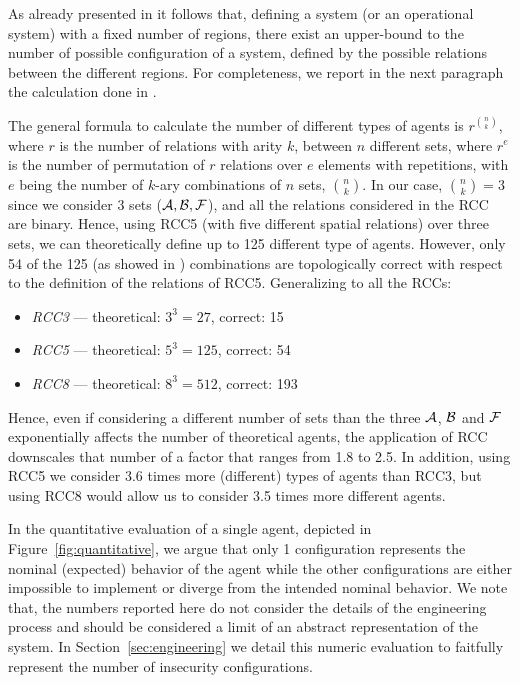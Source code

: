 As already presented in \autocite{Santaca2016abf} it follows that, defining
a system (or an operational system) with a fixed number of regions, there exist
an upper-bound to the number of possible configuration of a system, defined by
the possible relations between the different regions.
For completeness, we report in the next paragraph 
the calculation done in \autocite{Santaca2016abf}.

The general formula to calculate the number of different types of agents is
$r^{\binom{n}{k}}$, where $r$ is the number of relations with arity $k$,
between $n$ different sets, where $r^e$ is the number of permutation of $r$
relations over $e$ elements with repetitions, with $e$ being the number of
$k$-ary combinations of $n$ sets, $\binom{n}{k}$.
In our case, $\binom{n}{k}=3$ since we consider $3$ sets
($\mathcal{A},\mathcal{B},\mathcal{F}$), and all the relations
considered in the RCC are binary.  Hence, using RCC5 (with five different
spatial relations) over three sets, we can theoretically define up to 125
different type of agents. However, only 54 of the 125 (as showed in
\cite{improvingRCC}) combinations are topologically correct with respect to
the definition of the relations of RCC5. Generalizing to all the RCCs:

\begin{itemize}%
\item \emph{RCC3} --- theoretical: $3^3=27$,  correct: 15 
\item \emph{RCC5} --- theoretical: $5^3=125$, correct: 54
\item \emph{RCC8} --- theoretical: $8^3=512$, correct: 193
\end{itemize}

Hence, even if considering a different number of sets than the three
$\mathcal{A}$, $\mathcal{B}$ and $\mathcal{F}$ exponentially affects
the number of theoretical agents, the application of RCC downscales that number
of a factor that ranges from 1.8 to 2.5. In addition, using RCC5 we consider
3.6 times more (different) types of agents than RCC3, but using RCC8 would
allow us to consider 3.5 times more different agents.

In the quantitative evaluation of a single agent, depicted in Figure~\ref{fig:quantitative},
we argue that only 1 configuration represents the nominal (expected) behavior 
of the agent while the other configurations are either impossible to 
implement or diverge from the intended nominal behavior. We note 
that, the numbers reported here do not consider the details of the
engineering process and should be considered a limit of an abstract 
representation of the system. In Section~\ref{sec:engineering} we
detail this numeric evaluation to faitfully represent the
number of insecurity configurations.

